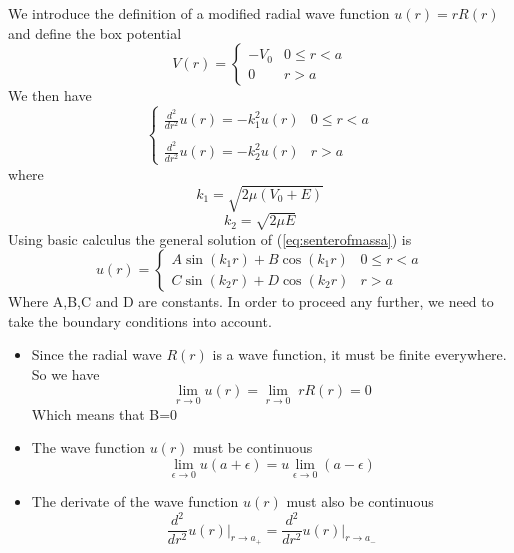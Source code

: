 We introduce the definition of a modified radial wave function
$u({ r})=rR(r)$ and define the box potential
\begin{equation}
V({r})=
\left\{
\begin{array}{ll}
-V_0 & 0\le r<a \\
0 & r>a
\end{array}
\right.
\end{equation}
%
We then have
\begin{equation}\label{eq:senterofmassa}
\left\{\begin{array}{ll}
\frac{d^2}{dr^2}u({ r})=-k^2_1u({ r}) & 0\le r<a\\
&\\
\frac{d^2}{dr^2}u({ r})=-k^2_2u({ r}) & r>a
\end{array}\right.
\end{equation}
%
where
\begin{equation}\label{eq:k_1} 
k_1=\sqrt{2\mu (V_0+E)}
\end{equation}
\begin{equation}\label{eq:k_2}
k_2=\sqrt{2\mu E}
\end{equation}
%
Using basic calculus the general solution of (\ref{eq:senterofmassa}) is
\begin{equation}
u({r})=
\left\{
\begin{array}{ll}
A\sin (k_1r)+B\cos(k_1r) &0\le r<a \\
C\sin(k_2r)+D\cos(k_2r) & r>a
\end{array}
\right.
\end{equation}
%
Where A,B,C and D are constants.
In order to proceed any further, we need to take the boundary conditions into account.
\begin{itemize}
\item Since the radial wave $R(r)$ is a wave function, it must be finite everywhere. So we have
\begin{equation}  
\lim_{r \rightarrow 0}u(r)=\lim_{r \rightarrow 0}\;rR(r)=0
\end{equation}
Which means that B=0
\item The wave function $u(r)$ must be continuous
\begin{equation}
\lim_{\epsilon \rightarrow 0}u(a+\epsilon)=u\lim_{\epsilon \rightarrow 0}(a-\epsilon)
\end{equation}
\item The derivate of the wave function $u(r)$ must also be continuous
\begin{equation}
\frac{d^2}{dr^2}u({ r})\big|_{r\rightarrow a_+}=\frac{d^2}{dr^2}u({ r})\big|_{r\rightarrow a_-}
\end{equation}
\end{itemize}
